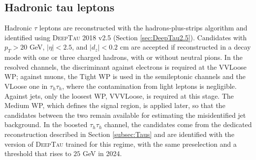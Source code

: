 \subsection{Hadronic tau leptons}
%

Hadronic $\tau$ leptons are reconstructed with the hadrons-plus-strips algorithm and identified using \textsc{DeepTau} 2018 v2.5 (Section \ref{sec:DeepTau2.5}). Candidates with $p_T > 20$ GeV, $|\eta| < 2.5$, and $|d_z| < 0.2$ cm are accepted if reconstructed in a decay mode with one or three charged hadrons, with or without neutral pions. In the resolved channels, the discriminant against electrons is required at the VVLoose WP; against muons, the Tight WP is used in the semileptonic channels and the VLoose one in $\tau_h\tau_h$, where the contamination from light leptons is negligible. Against jets, only the loosest WP, VVVLoose, is required at this stage. The Medium WP, which defines the signal region, is applied later, so that the candidates between the two remain available for estimating the misidentified jet background. In the boosted $\tau_h\tau_h$ channel, the candidates come from the dedicated reconstruction described in Section \ref{subsec:Taus} and are identified with the version of \textsc{DeepTau} trained for this regime, with the same preselection and a threshold that rises to $25$ GeV in 2024.


